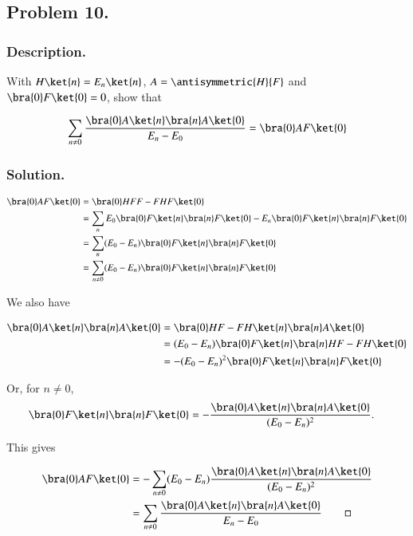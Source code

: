 \subsection{Problem 10. }
\subsubsection{Description. }

With $H \ket{n} = E_n \ket{n}$, $A = \antisymmetric{H}{F}$ and $\bra{0} F \ket{0} = 0$, show that

\begin{align}\label{eqn:desaiCh3:1000}
\sum_{n\ne 0} \frac{
\bra{0} A \ket{n} \bra{n} A \ket{0} }{E_n - E_0} = 
\bra{0} AF \ket{0}
\end{align}

\subsubsection{Solution. }

\begin{align*}
\bra{0} AF \ket{0}
&=
\bra{0} HF F - FH F\ket{0} \\
&=
\sum_n E_0 \bra{0} F \ket{n}\bra{n} F \ket{0} - E_n \bra{0} F \ket{n} \bra{n} F\ket{0} \\
&=
\sum_n (E_0 -E_n) \bra{0} F \ket{n}\bra{n} F \ket{0}  \\
&=
\sum_{n\ne0} (E_0 -E_n) \bra{0} F \ket{n}\bra{n} F \ket{0}  \\
\end{align*}

We also have

\begin{align*}
\bra{0} A \ket{n} \bra{n} A \ket{0}
&=
\bra{0} HF -F H \ket{n} \bra{n} A \ket{0} \\
&=
(E_0 - E_n) \bra{0} F \ket{n} \bra{n} HF - FH \ket{0} \\
&=
-(E_0 - E_n)^2 \bra{0} F \ket{n} \bra{n} F \ket{0} \\
\end{align*}

Or, for $n \ne 0$, 
\begin{align*}
\bra{0} F \ket{n} \bra{n} F \ket{0} &=
-\frac{\bra{0} A \ket{n} \bra{n} A \ket{0}}{(E_0 - E_n)^2 }.
\end{align*}

This gives

\begin{align*}
\bra{0} AF \ket{0}
&=
-\sum_{n\ne0} (E_0 -E_n) \frac{\bra{0} A \ket{n} \bra{n} A \ket{0}}{(E_0 - E_n)^2 } \\
&=
\sum_{n\ne0} \frac{\bra{0} A \ket{n} \bra{n} A \ket{0}}{E_n - E_0 } 
\qquad\square
\end{align*}

